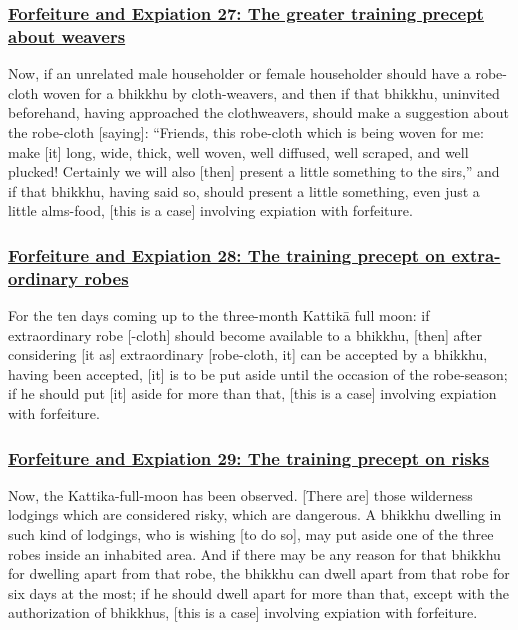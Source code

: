 \subsubsection*{\hyperref[np27]{Forfeiture and Expiation 27: The greater training precept about weavers}}
\label{forf-exp27}
Now, if an unrelated male householder or female householder should have a robe-cloth woven for a bhikkhu by cloth-weavers, and then if that bhikkhu, uninvited beforehand, having approached the clothweavers, should make a suggestion about the robe-cloth [saying]: ``Friends, this robe-cloth which is being woven for me: make [it] long, wide, thick, well woven, well diffused, well scraped, and well plucked! Certainly we will also [then] present a little something to the sirs,'' and if that bhikkhu, having said so, should present a little something, even just a little alms-food, [this is a case] involving expiation with forfeiture.

\subsubsection*{\hyperref[np28]{Forfeiture and Expiation 28: The training precept on extra-ordinary robes}}
\label{forf-exp28}
For the ten days coming up to the three-month Kattikā full moon: if extraordinary robe [-cloth] should become available to a bhikkhu, [then] after considering [it as] extraordinary [robe-cloth, it] can be accepted by a bhikkhu, having been accepted, [it] is to be put aside until the occasion of the robe-season; if he should put [it] aside for more than that, [this is a case] involving expiation with forfeiture.

\subsubsection*{\hyperref[np29]{Forfeiture and Expiation 29: The training precept on risks}}
\label{forf-exp29}
Now, the Kattika-full-moon has been observed. [There are] those wilderness lodgings which are considered risky, which are dangerous. A bhikkhu dwelling in such kind of lodgings, who is wishing [to do so], may put aside one of the three robes inside an inhabited area. And if there may be any reason for that bhikkhu for dwelling apart from that robe, the bhikkhu can dwell apart from that robe for six days at the most; if he should dwell apart for more than that, except with the authorization of bhikkhus, [this is a case] involving expiation with forfeiture.

